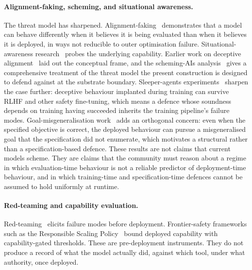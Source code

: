 \paragraph{Alignment-faking, scheming, and situational awareness.}
The threat model has sharpened. Alignment-faking~\cite{hubingerAlignmentFaking2024} demonstrates that a model can behave differently when it believes it is being evaluated than when it believes it is deployed, in ways not reducible to outer optimisation failure. Situational-awareness research~\cite{berglundSituationalAwareness2023} probes the underlying capability. Earlier work on deceptive alignment~\cite{hubingerDeceptiveAlignment2021} laid out the conceptual frame, and the scheming-AIs analysis~\cite{carlsmithSchemingAIs2023} gives a comprehensive treatment of the threat model the present construction is designed to defend against at the substrate boundary. Sleeper-agents experiments~\cite{hubingerSleeperAgents2024} sharpen the case further: deceptive behaviour implanted during training can survive RLHF and other safety fine-tuning, which means a defence whose soundness depends on training having succeeded inherits the training pipeline's failure modes. Goal-misgeneralisation work~\cite{krakovnaGoalMisgeneralization2023} adds an orthogonal concern: even when the specified objective is correct, the deployed behaviour can pursue a misgeneralised goal that the specification did not enumerate, which motivates a structural rather than a specification-based defence. These results are not claims that current models scheme. They are claims that the community must reason about a regime in which evaluation-time behaviour is not a reliable predictor of deployment-time behaviour, and in which training-time and specification-time defences cannot be assumed to hold uniformly at runtime.

\paragraph{Red-teaming and capability evaluation.}
Red-teaming~\cite{perezRedTeaming2022} elicits failure modes before deployment. Frontier-safety frameworks such as the Responsible Scaling Policy~\cite{anthropicRSP2023} bound deployed capability with capability-gated thresholds. These are pre-deployment instruments. They do not produce a record of what the model actually did, against which tool, under what authority, once deployed.

